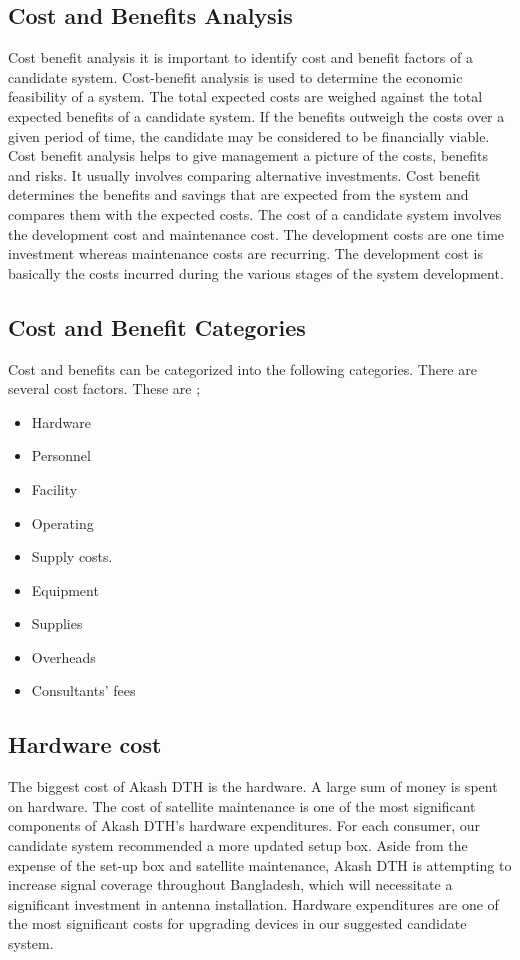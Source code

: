 \begin{spacing}{1}
\section{Cost and Benefits Analysis }
Cost benefit analysis  it is important to identify cost and benefit factors of a candidate system. Cost-benefit analysis is used to determine the economic feasibility of a system. The total expected costs are weighed against the total expected benefits of a candidate system. If the benefits outweigh the costs over a given period of time, the candidate may be considered to be financially viable.
Cost benefit analysis helps to give management a picture of the costs, benefits and risks. It usually involves comparing alternative investments.
Cost benefit determines the benefits and savings that are expected from the system and compares them with the expected costs.
The cost of a candidate system involves the development cost and maintenance cost. The development costs are one time investment whereas maintenance costs are recurring. The development cost is basically the costs incurred during the various stages of the system development.
\subsection{ Cost and Benefit Categories }
Cost and benefits can be categorized into the following categories.
There are several cost factors. These are ;

\begin{itemize}
\item  Hardware
\item Personnel
\item Facility
\item Operating 
\item Supply costs.
\item Equipment
\item Supplies
\item Overheads
\item Consultants' fees
\end{itemize}

\subsection{Hardware cost}
The biggest cost of Akash DTH is the hardware. A large sum of money is spent on hardware. The cost of satellite maintenance is one of the most significant components of Akash DTH's hardware expenditures. For each consumer, our candidate system recommended a more updated setup box. Aside from the expense of the set-up box and satellite maintenance, Akash DTH is attempting to increase signal coverage throughout Bangladesh, which will necessitate a significant investment in antenna installation.
Hardware expenditures are one of the most significant costs for upgrading devices in our suggested candidate system.

\end{spacing}
